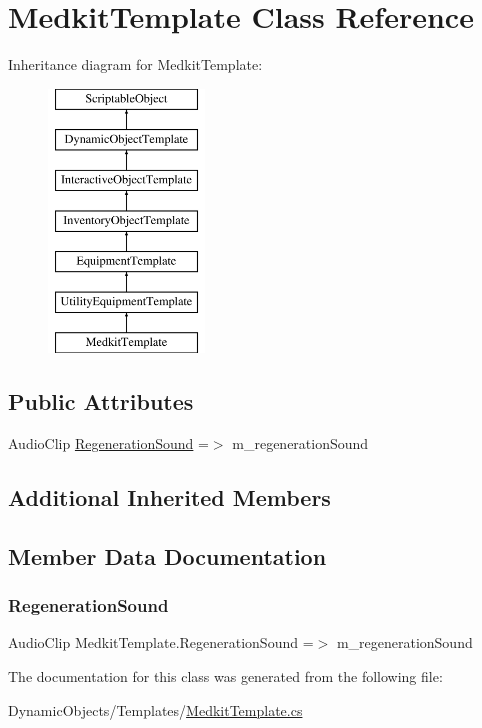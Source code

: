 \hypertarget{class_medkit_template}{}\section{Medkit\+Template Class Reference}
\label{class_medkit_template}
Inheritance diagram for Medkit\+Template\+:\begin{figure}[H]
\begin{center}
\leavevmode
\includegraphics[height=7.000000cm]{class_medkit_template}
\end{center}
\end{figure}
\subsection*{Public Attributes}
\begin{DoxyCompactItemize}
\item 
Audio\+Clip \mbox{\hyperlink{class_medkit_template_a37b6e4481829e99f027f030c699a4b71}{Regeneration\+Sound}} =$>$ m\+\_\+regeneration\+Sound
\end{DoxyCompactItemize}
\subsection*{Additional Inherited Members}


\subsection{Member Data Documentation}
\mbox{\label{class_medkit_template_a37b6e4481829e99f027f030c699a4b71}} 
\subsubsection{\texorpdfstring{Regeneration\+Sound}{RegenerationSound}}
{\footnotesize\ttfamily Audio\+Clip Medkit\+Template.\+Regeneration\+Sound =$>$ m\+\_\+regeneration\+Sound}



The documentation for this class was generated from the following file\+:\begin{DoxyCompactItemize}
\item 
Dynamic\+Objects/\+Templates/\mbox{\hyperlink{_medkit_template_8cs}{Medkit\+Template.\+cs}}\end{DoxyCompactItemize}
